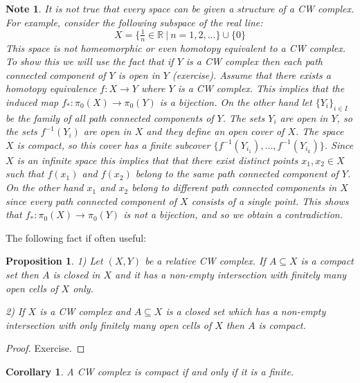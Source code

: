 \documentclass[11pt, letterpaper, oneside]{report}
\theoremstyle{pplain}
\newtheorem{proposition}[theorem]{Proposition}
\newtheorem{corollary}[theorem]{Corollary}
\theoremstyle{ddefinition}
\newtheorem{note}[theorem]{Note}
\theoremstyle{nnn}
\theoremstyle{eexercise}
\newcommand{\R}{{\mathbb R}}
\begin{document}
\begin{note}
It is not true that every space can be given a structure of a CW complex. 
For example, 
consider the following subspace of the real line:
$$X = \{\tfrac{1}{n} \in \R \ | \ n = 1, 2, \dots \} \cup \{0\}$$
This space is not homeomorphic or even homotopy equivalent to a CW complex.
To show this we will use the fact that if $Y$ is a CW complex then each path connected component of $Y$
is open in $Y$ (exercise). Assume  that there exists a homotopy equivalence $f\colon X \to Y$ where 
$Y$ is a CW complex. This implies that the induced map $f_{\ast}\colon \pi_{0}(X) \to \pi_{0}(Y)$
is a bijection. On the other hand let $\{Y_{i}\}_{i\in I}$ be the family of all path connected components 
of $Y$. The sets $Y_{i}$ are open in $Y$, so the sets $f^{-1}(Y_{i})$ are open in $X$ 
and they define an open cover of $X$.  The space $X$ is compact, so this cover has a finite subcover 
$\{f^{-1}(Y_{i_{1}}), \dots, f^{-1}(Y_{i_{k}})\}$. Since $X$ is an infinite space this implies that that 
there exist distinct points  $x_{1}, x_{2}\in X$ such that $f(x_{1})$ and $f(x_{2})$
belong to the same path connected component of $Y$. On the other hand $x_{1}$ and $x_{2}$
belong to different path connected components in $X$ since every path connected component of $X$
consists of a single point. This shows that $f_{\ast}\colon \pi_{0}(X) \to \pi_{0}(Y)$ is not a bijection, 
and so we obtain a contradiction. 


\end{note}


The following fact if often useful: 


\begin{proposition}
\label{COMPACT CW COMPLEX PROP}
1) Let $(X, Y)$ be a relative CW complex. If $A\subseteq X$ is a compact set then $A$ is closed 
in $X$ and it has a non-empty intersection with  finitely many open cells of $X$ only.  

2) If $X$ is a CW complex and $A\subseteq X$ is a closed set which has a non-empty intersection 
with  only finitely many open cells of $X$  then $A$ is compact. 
\end{proposition}

\begin{proof}
Exercise. 
\end{proof}


\begin{corollary}
\label{FINITE CW COMPACT COR}
A CW complex is compact if and only if it is a finite. 
\end{corollary}
\end{document}

